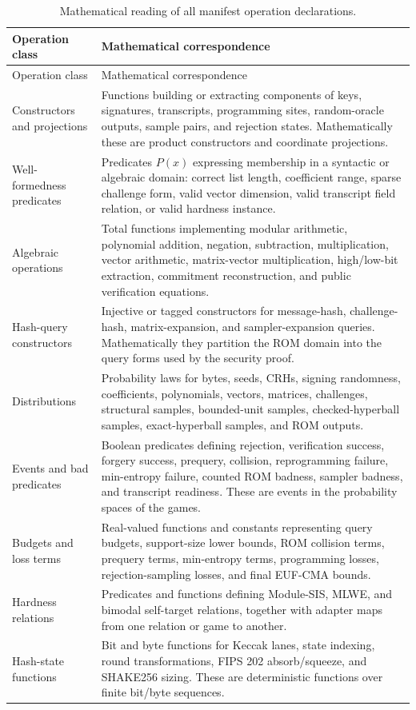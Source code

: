 \begin{longtable}{p{}p{}}
\caption{Mathematical reading of all manifest operation declarations.}
\label{tab:op-correspondence}\\
\toprule
Operation class & Mathematical correspondence \\
\midrule
\endfirsthead
\toprule
Operation class & Mathematical correspondence \\
\midrule
\endhead
Constructors and projections &
Functions building or extracting components of keys, signatures, transcripts,
programming sites, random-oracle outputs, sample pairs, and rejection states.
Mathematically these are product constructors and coordinate projections. \\
Well-formedness predicates &
Predicates \(P(x)\) expressing membership in a syntactic or algebraic domain:
correct list length, coefficient range, sparse challenge form, valid vector
dimension, valid transcript field relation, or valid hardness instance. \\
Algebraic operations &
Total functions implementing modular arithmetic, polynomial addition,
negation, subtraction, multiplication, vector arithmetic, matrix-vector
multiplication, high/low-bit extraction, commitment reconstruction, and public
verification equations. \\
Hash-query constructors &
Injective or tagged constructors for message-hash, challenge-hash,
matrix-expansion, and sampler-expansion queries.  Mathematically they partition
the ROM domain into the query forms used by the security proof. \\
Distributions &
Probability laws for bytes, seeds, CRHs, signing randomness, coefficients,
polynomials, vectors, matrices, challenges, structural samples,
bounded-unit samples, checked-hyperball samples, exact-hyperball samples, and
ROM outputs. \\
Events and bad predicates &
Boolean predicates defining rejection, verification success, forgery success,
prequery, collision, reprogramming failure, min-entropy failure, counted ROM
badness, sampler badness, and transcript readiness.  These are events in the
probability spaces of the games. \\
Budgets and loss terms &
Real-valued functions and constants representing query budgets, support-size
lower bounds, ROM collision terms, prequery terms, min-entropy terms,
programming losses, rejection-sampling losses, and final EUF-CMA bounds. \\
Hardness relations &
Predicates and functions defining Module-SIS, MLWE, and bimodal self-target
relations, together with adapter maps from one relation or game to another. \\
Hash-state functions &
Bit and byte functions for Keccak lanes, state indexing, round transformations,
FIPS 202 absorb/squeeze, and SHAKE256 sizing.  These are deterministic functions
over finite bit/byte sequences. \\
\bottomrule
\end{longtable}

